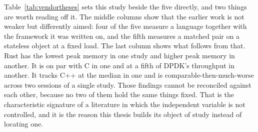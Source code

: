 \documentclass[english,twoside,openright,a4paper,censored,csm,software-track-2020]{HYthesisML}
\begin{document}
Table~\ref{tab:vendortheses} sets this study beside the five directly, and two things are worth
reading off it. The middle columns show that the earlier work is not weaker but differently
aimed: four of the five measure a language together with the framework it was written on, and the
fifth measures a matched pair on a stateless object at a fixed load. The last column shows what
follows from that. Rust has the lowest peak memory in one study and higher peak memory in
another. It is on par with C in one and at a fifth of DPDK's throughput in another. It tracks C++
at the median in one and is comparable-then-much-worse across two sessions of a single study.
Those findings cannot be reconciled against each other, because no two of them hold the same
things fixed. That is the characteristic signature of a literature in which the independent
variable is not controlled, and it is the reason this thesis builds its object of study instead of
locating one.
\end{document}
